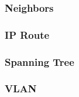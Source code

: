 \subsubsection{Neighbors}


\subsubsection{IP Route}


\subsubsection{Spanning Tree}


\subsubsection{VLAN}
